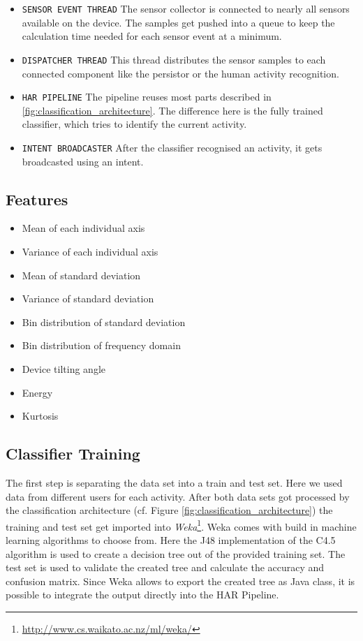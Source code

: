 \begin{itemize}
  \item \texttt{SENSOR EVENT THREAD} The sensor collector is connected to nearly
    all sensors available on the device. The samples get pushed into a queue to 
    keep the calculation time needed for each sensor event at a minimum.
  \item \texttt{DISPATCHER THREAD} This thread distributes the sensor samples to
    each connected component like the persistor or the human activity 
    recognition.
  \item \texttt{HAR PIPELINE} The pipeline reuses most parts described in 
    \ref{fig:classification_architecture}. The difference here is the fully 
    trained classifier, which tries to identify the current activity.
  \item \texttt{INTENT BROADCASTER} After the classifier recognised an activity,
    it gets broadcasted using an intent.
\end{itemize}


\subsection{Features}\label{sec:har_features}

\begin{itemize}
  \item Mean of each individual axis
  \item Variance of each individual axis
  \item Mean of standard deviation
  \item Variance of standard deviation
  \item Bin distribution of standard deviation
  \item Bin distribution of frequency domain
  \item Device tilting angle
  \item Energy
  \item Kurtosis
\end{itemize}


\subsection{Classifier Training}\label{sec:har_classifier_training}

The first step is separating the data set into a train and test set. Here we 
used data from different users for each activity. After both data sets got 
processed by the classification architecture (cf. Figure \ref{fig:classification_architecture})
the training and test set get imported into {\it Weka}\footnote{\url{http://www.cs.waikato.ac.nz/ml/weka/}}.
Weka comes with build in machine learning algorithms to choose from. Here the 
J48 implementation of the C4.5 algorithm is used to create a decision tree out 
of the provided training set. The test set is used to validate the created tree
and calculate the accuracy and confusion matrix. Since Weka allows to export 
the created tree as Java class, it is possible to integrate the output directly 
into the HAR Pipeline.


